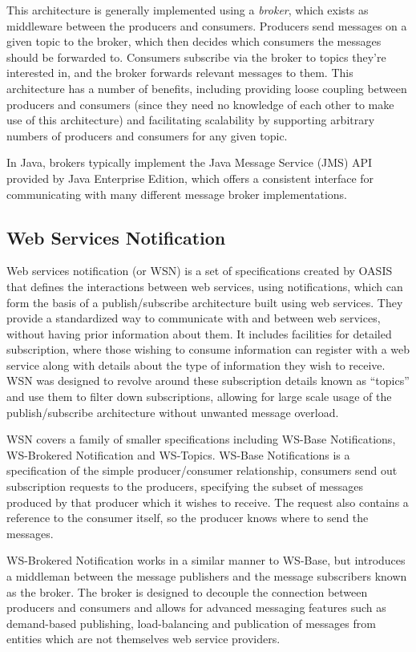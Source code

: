 \documentclass[a4paper, 12pt]{article}
\begin{document}
This architecture is generally implemented using a \emph{broker}, which exists as middleware between the producers and consumers. Producers send messages on a given topic to the broker, which then decides which consumers the messages should be forwarded to. Consumers subscribe via the broker to topics they’re interested in, and the broker forwards relevant messages to them. This architecture has a number of benefits, including providing loose coupling between producers and consumers (since they need no knowledge of each other to make use of this architecture) and facilitating scalability by supporting arbitrary numbers of producers and consumers for any given topic.

In Java, brokers typically implement the Java Message Service (JMS) API provided by Java Enterprise Edition, which offers a consistent interface for communicating with many different message broker implementations.

\subsection{Web Services Notification}

Web services notification (or WSN) is a set of specifications created by OASIS that defines the interactions between web services, using notifications, which can form the basis of a publish/subscribe architecture built using web services. They provide a standardized way to communicate with and between web services, without having prior information about them. It includes facilities for detailed subscription, where those wishing to consume information can register with a web service along with details about the type of information they wish to receive. WSN was designed to revolve around these subscription details known as ``topics'' and use them to filter down subscriptions, allowing for large scale usage of the publish/subscribe architecture without unwanted message overload.

WSN covers a family of smaller specifications including WS-Base Notifications, WS-Brokered Notification and WS-Topics. WS-Base Notifications is a specification of the simple producer/consumer relationship, consumers send out subscription requests to the producers, specifying the subset of messages produced by that producer which it wishes to receive. The request also contains a reference to the consumer itself, so the producer knows where to send the messages.

WS-Brokered Notification works in a similar manner to WS-Base, but introduces a middleman between the message publishers and the message subscribers known as the broker. The broker is designed to decouple the connection between producers and consumers and allows for advanced messaging features such as demand-based publishing, load-balancing and publication of messages from entities which are not themselves web service providers.
\end{document}
